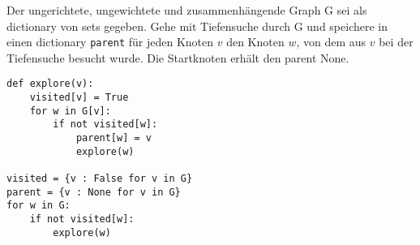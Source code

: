 ﻿\question[6]
Der ungerichtete, ungewichtete und zusammenhängende Graph G sei als dictionary von
sets gegeben.
Gehe mit Tiefensuche durch G und
speichere in einen dictionary \texttt{parent} für jeden
Knoten $v$ den Knoten $w$, von dem aus $v$ bei der Tiefensuche
besucht wurde. Die Startknoten erhält den parent None.

\begin{solutionbox}{13cm}
\begin{lstlisting}
def explore(v):
    visited[v] = True
    for w in G[v]:
        if not visited[w]:
            parent[w] = v
            explore(w)

visited = {v : False for v in G}
parent = {v : None for v in G}
for w in G:
    if not visited[w]:
        explore(w)

\end{lstlisting}
\end{solutionbox}
